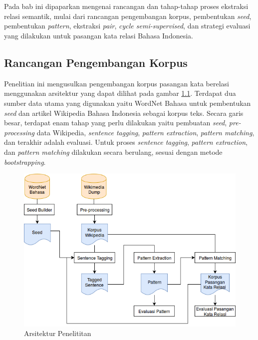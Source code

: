 \chapter{\babTiga}
Pada bab ini dipaparkan mengenai rancangan dan tahap-tahap proses ekstraksi relasi semantik, mulai dari rancangan pengembangan korpus, pembentukan \textit{seed}, pembentukan \textit{pattern}, ekstraksi \textit{pair}, \textit{cycle semi-supervised}, dan strategi evaluasi yang dilakukan untuk pasangan kata relasi Bahasa Indonesia. 


\section{Rancangan Pengembangan Korpus}
Penelitian ini mengusulkan pengembangan korpus pasangan kata berelasi menggunakan arsitektur yang dapat dilihat pada gambar \ref{fig:arsitektur-penelitian}. Terdapat dua sumber data utama yang digunakan yaitu WordNet Bahasa untuk pembentukan \textit{seed} dan artikel Wikipedia Bahasa Indonesia sebagai korpus teks. Secara garis besar, terdapat enam tahap yang perlu dilakukan yaitu pembuatan \textit{seed}, \textit{pre-processing} data Wikipedia, \textit{sentence tagging}, \textit{pattern extraction}, \textit{pattern matching}, dan terakhir adalah evaluasi. Untuk proses \textit{sentence tagging}, \textit{pattern extraction}, dan \textit{pattern matching} dilakukan secara berulang, sesuai dengan metode \textit{bootstrapping}. 

\begin{figure}
    \centering
    \includegraphics[width=\linewidth]{pics/Pic01-SemiSupervisedCycle}
    \caption{Arsitektur Penelititan}
    \label{fig:arsitektur-penelitian}
\end{figure}

